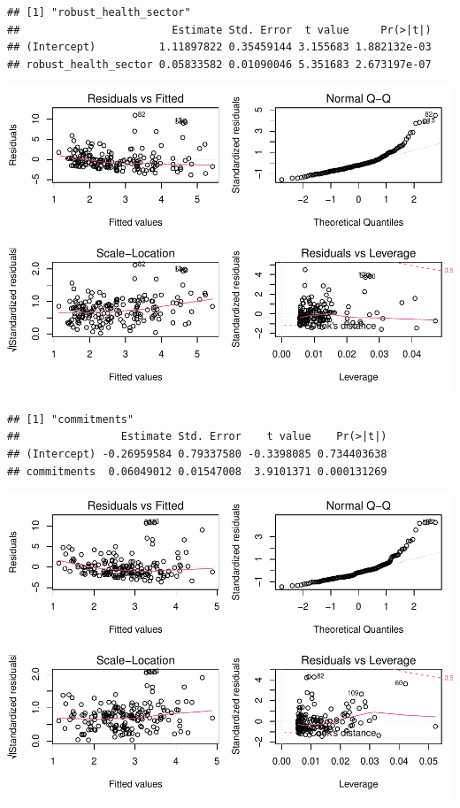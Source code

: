 \documentclass[
]{article}
\begin{document}
\begin{verbatim}
## [1] "robust_health_sector"
##                        Estimate Std. Error  t value     Pr(>|t|)
## (Intercept)          1.11897822 0.35459144 3.155683 1.882132e-03
## robust_health_sector 0.05833582 0.01090046 5.351683 2.673197e-07
\end{verbatim}

\includegraphics{Basic-Regression_files/figure-latex/unnamed-chunk-6-4.pdf}

\begin{verbatim}
## [1] "commitments"
##                Estimate Std. Error    t value    Pr(>|t|)
## (Intercept) -0.26959584 0.79337580 -0.3398085 0.734403638
## commitments  0.06049012 0.01547008  3.9101371 0.000131269
\end{verbatim}

\includegraphics{Basic-Regression_files/figure-latex/unnamed-chunk-6-5.pdf}
\end{document}
